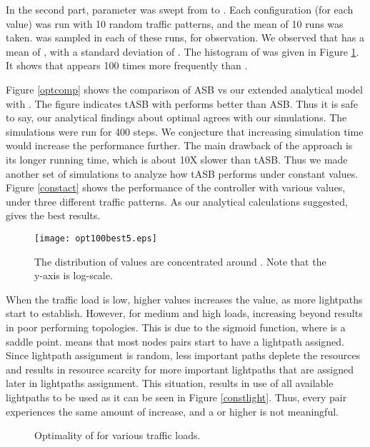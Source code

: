\documentclass[conference]{IEEEtran}
\begin{document}
 
In the second part,  parameter was swept from  to .
Each configuration (for each  value) was run with 10 random traffic patterns, and  the mean of 10 runs was taken. 
  was sampled in each of these runs, for observation. 
We observed that  has a mean of , with a standard deviation of . 
The histogram of   was given in Figure \ref{opthist}. 
It shows that  appears 100 times more frequently than .


Figure \ref{optcomp} shows the comparison of ASB vs our extended analytical model with .
The figure indicates tASB with  performs better than ASB.
Thus it is safe to say, our analytical findings about optimal  agrees with our simulations.
The simulations were run for 400 steps. We conjecture that increasing simulation time would  increase the performance further.
The main drawback of the  approach is its longer running time, which is about 10X slower than  tASB.
Thus we made another set of simulations to analyze how tASB performs under constant  values.
  Figure \ref{constact} shows the performance of the controller with various  values, under 
three different traffic patterns. As our analytical calculations suggested,  gives the best results. 

 \begin{figure}[hb] 
 \centering
   \texttt{[image: opt100best5.eps]}
\caption{The distribution of  values are concentrated around .
 Note that the y-axis is log-scale.
 }
\label{opthist}
\end{figure}

When the traffic load is low, higher  values increases the value, as more lightpaths start to establish. 
However, for medium and high loads, increasing  beyond  results in poor performing topologies. 
 This is due to the sigmoid function, where  is a saddle point.  means that most nodes pairs start to have a lightpath assigned. 
Since lightpath assignment is random, less important paths deplete the resources and results in resource scarcity for more important lightpaths that are assigned later in lightpaths assignment.
This situation, results in use of all available lightpaths to be used as it can be seen in Figure \ref{constlight}.
Thus, every pair  experiences the same amount of increase, and a  or higher is not meaningful.
\begin{figure*}[thb]
\centering
 \def\mywidth{0.3}
\hfill
  \hfill
{}
\label{diffload}
 \caption{Optimality of   for various traffic loads.
 }
\end{figure*}
 
\end{document}
